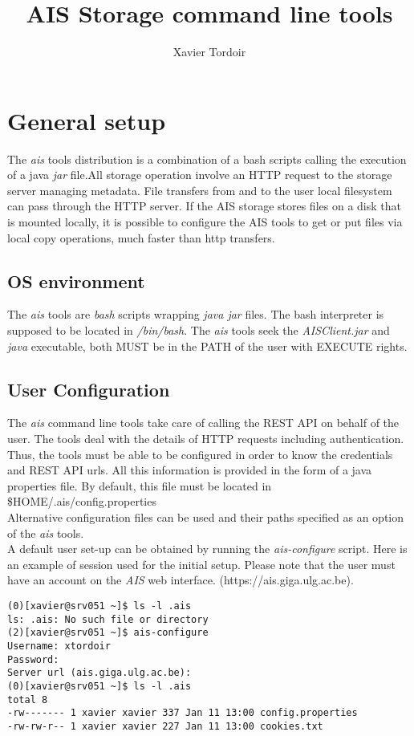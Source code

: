 \documentclass[11pt]{article}
\title{AIS Storage command line tools}
\author{Xavier Tordoir}
\begin{document}
\maketitle
\tableofcontents
\section{General setup}
The \emph{ais} tools distribution is a combination of a bash scripts calling the execution of a java \emph{jar} file.All storage operation involve an HTTP request to the storage server managing metadata. File transfers from and to the user local filesystem can pass through the HTTP server. If the AIS storage stores files on a disk that is mounted locally, it is possible to configure the AIS tools to get or put files via local copy operations, much faster than http transfers.\subsection{OS environment}
The \emph{ais} tools are \emph{bash} scripts wrapping \emph{java jar} files. The bash interpreter is supposed to be located in \emph{/bin/bash}. The \emph{ais} tools seek the \emph{AISClient.jar} and \emph{java} executable, both MUST be in the PATH of the user with EXECUTE rights.\\
\subsection{User Configuration}
The \emph{ais} command line tools take care of calling the REST API on behalf of the user. The tools deal with the details of HTTP requests including authentication. Thus, the tools must be able to be configured in order to know the credentials and REST API urls. All this information is provided in the form of a java properties file. By default, this file must be located in \$HOME/.ais/config.properties\\
Alternative configuration files can be used and their paths specified as an option of the \emph{ais} tools.\\
A default user set-up can be obtained by running the \emph{ais-configure} script. Here is an example of session used for the initial setup. Please note that the user must have an account on the \emph{AIS} web interface. (https://ais.giga.ulg.ac.be).
\begin{verbatim}
(0)[xavier@srv051 ~]$ ls -l .ais
ls: .ais: No such file or directory
(2)[xavier@srv051 ~]$ ais-configure 
Username: xtordoir
Password: 
Server url (ais.giga.ulg.ac.be): 
(0)[xavier@srv051 ~]$ ls -l .ais
total 8
-rw------- 1 xavier xavier 337 Jan 11 13:00 config.properties
-rw-rw-r-- 1 xavier xavier 227 Jan 11 13:00 cookies.txt
\end{verbatim}
\end{document}
